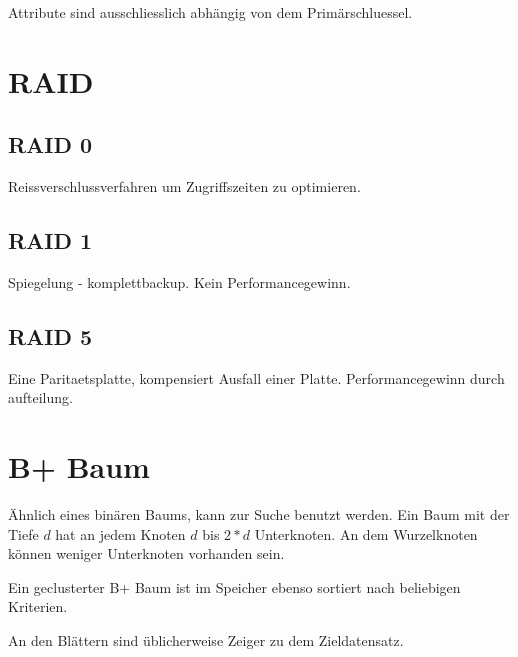 \documentclass[10pt,a4paper,oneside]{report}
\begin{document}
Attribute sind ausschliesslich abhängig von dem Primärschluessel.

\section*{RAID}

\subsection*{RAID 0}

Reissverschlussverfahren um Zugriffszeiten zu optimieren.

\subsection*{RAID 1}

Spiegelung - komplettbackup. Kein Performancegewinn.

\subsection*{RAID 5}

Eine Paritaetsplatte, kompensiert Ausfall einer Platte. Performancegewinn durch aufteilung.

\section*{B+ Baum}

Ähnlich eines binären Baums, kann zur Suche benutzt werden. Ein Baum mit der Tiefe $d$ hat an jedem Knoten $d$ bis $2*d$ Unterknoten. An dem Wurzelknoten können weniger Unterknoten vorhanden sein.

Ein geclusterter B+ Baum ist im Speicher ebenso sortiert nach beliebigen Kriterien.

An den Blättern sind üblicherweise Zeiger zu dem Zieldatensatz.
\end{document}
